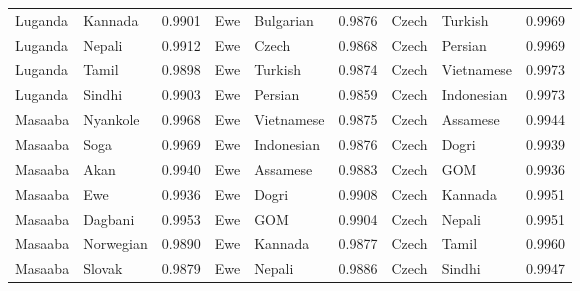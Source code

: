 \documentclass[11pt]{article} %
\begin{document}
\begin{table}
\begin{tabular}{llr@{\hspace{12pt}}llr@{\hspace{12pt}}llr}
            Luganda                      & Kannada             & 0.9901        & Ewe                 & Bulgarian           & 0.9876        & Czech               & Turkish             & 0.9969        \\
            Luganda                      & Nepali              & 0.9912        & Ewe                 & Czech               & 0.9868        & Czech               & Persian             & 0.9969        \\
            Luganda                      & Tamil               & 0.9898        & Ewe                 & Turkish             & 0.9874        & Czech               & Vietnamese          & 0.9973        \\
            Luganda                      & Sindhi              & 0.9903        & Ewe                 & Persian             & 0.9859        & Czech               & Indonesian          & 0.9973        \\
            Masaaba                      & Nyankole            & 0.9968        & Ewe                 & Vietnamese          & 0.9875        & Czech               & Assamese            & 0.9944        \\
            Masaaba                      & Soga                & 0.9969        & Ewe                 & Indonesian          & 0.9876        & Czech               & Dogri               & 0.9939        \\
            Masaaba                      & Akan                & 0.9940        & Ewe                 & Assamese            & 0.9883        & Czech               & GOM                 & 0.9936        \\
            Masaaba                      & Ewe                 & 0.9936        & Ewe                 & Dogri               & 0.9908        & Czech               & Kannada             & 0.9951        \\
            Masaaba                      & Dagbani             & 0.9953        & Ewe                 & GOM                 & 0.9904        & Czech               & Nepali              & 0.9951        \\
            Masaaba                      & Norwegian           & 0.9890        & Ewe                 & Kannada             & 0.9877        & Czech               & Tamil               & 0.9960        \\
            Masaaba                      & Slovak              & 0.9879        & Ewe                 & Nepali              & 0.9886        & Czech               & Sindhi              & 0.9947        \\

\end{tabular}
\end{table}
\end{document}
